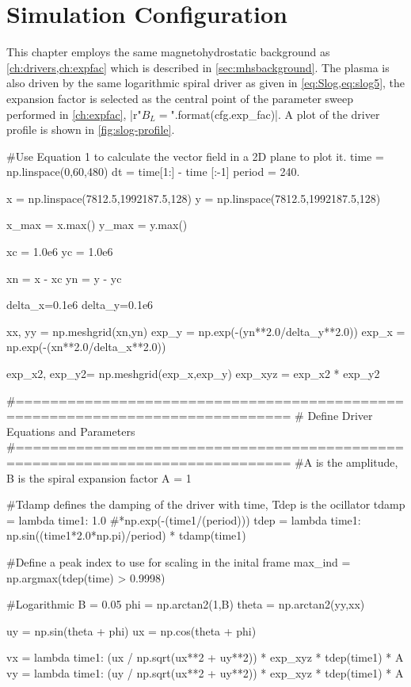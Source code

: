 \section{Simulation Configuration}\label{sec:periodconfig}
This chapter employs the same magnetohydrostatic background as \cref{ch:drivers,ch:expfac} which is described in \cref{sec:mhsbackground}.
The plasma is also driven by the same logarithmic spiral driver as given in \cref{eq:Slog,eq:slog5}, the expansion factor is selected as the central point of the parameter sweep performed in \cref{ch:expfac}, \py[chapter6]|r"$B_L={}$".format(cfg.exp_fac)|.
A plot of the driver profile is shown in \cref{fig:slog-profile}.

\begin{pycode}[chapter6]

#Use Equation 1 to calculate the vector field in a 2D plane to plot it.
time = np.linspace(0,60,480)
dt = time[1:] - time [:-1]
period = 240.

x = np.linspace(7812.5,1992187.5,128)
y = np.linspace(7812.5,1992187.5,128)

x_max = x.max()
y_max = y.max()

xc = 1.0e6
yc = 1.0e6

xn = x - xc
yn = y - yc

delta_x=0.1e6
delta_y=0.1e6

xx, yy = np.meshgrid(xn,yn)
exp_y = np.exp(-(yn**2.0/delta_y**2.0))
exp_x = np.exp(-(xn**2.0/delta_x**2.0))

exp_x2, exp_y2= np.meshgrid(exp_x,exp_y)
exp_xyz = exp_x2 * exp_y2


#==============================================================================
# Define Driver Equations and Parameters
#==============================================================================
#A is the amplitude, B is the spiral expansion factor
A = 1

#Tdamp defines the damping of the driver with time, Tdep is the ocillator
tdamp = lambda time1: 1.0 #*np.exp(-(time1/(period)))
tdep = lambda time1: np.sin((time1*2.0*np.pi)/period) * tdamp(time1)

#Define a peak index to use for scaling in the inital frame
max_ind = np.argmax(tdep(time) > 0.9998)

#Logarithmic
B = 0.05
phi = np.arctan2(1,B)
theta = np.arctan2(yy,xx)

uy = np.sin(theta + phi)
ux =  np.cos(theta + phi)

vx = lambda time1: (ux / np.sqrt(ux**2 + uy**2)) * exp_xyz * tdep(time1) * A
vy = lambda time1: (uy / np.sqrt(ux**2 + uy**2)) * exp_xyz * tdep(time1) * A


\end{pycode}
